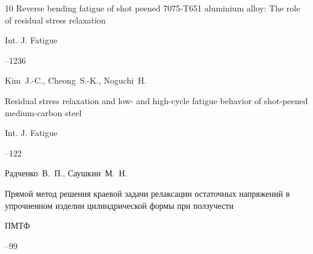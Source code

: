\begin{thebibliography}{10}
\paper Reverse bending fatigue of shot peened 7075-T651 aluminium alloy: The role of residual stress relaxation

\jour Int. J. Fatigue




--1236






\by  Kim~J.-C., Cheong~S.-K.,  Noguchi~H.

\paper Residual stress relaxation and low- and high-cycle fatigue behavior of shot-peened medium-carbon steel

\jour Int. J. Fatigue



--122






\by Радченко~В.~П., Саушкин~М.~Н.

\paper Прямой метод решения краевой задачи релаксации остаточных напряжений в упрочненном изделии цилиндрической формы при ползучести

\jour ПМТФ




--99













\end{thebibliography}
